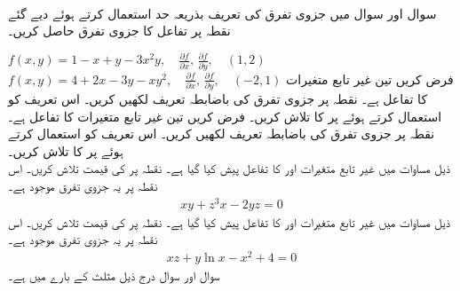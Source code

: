 \\
سوال  اور سوال  میں جزوی تفرق کی تعریف بذریعہ حد استعمال کرتے ہوئے دیے گئے نقطہ پر تفاعل کا جزوی تفرق حاصل کریں۔

$f(x,y)=1-x+y-3x^2y,\quad \frac{\partial f}{\partial x},\,\frac{\partial f}{\partial y},\quad (1,2)$
$f(x,y)=4+2x-3y-xy^2,\quad \frac{\partial f}{\partial x},\,\frac{\partial f}{\partial y},\quad (-2,1)$
فرض کریں  تین غیر تابع متغیرات کا تفاعل ہے۔ نقطہ  پر جزوی تفرق   کی باضابطہ تعریف  لکھیں کریں۔ اس تعریف کو استعمال کرتے ہوئے  پر  کا  تلاش کریں۔
فرض کریں  تین غیر تابع متغیرات کا تفاعل ہے۔ نقطہ  پر جزوی تفرق   کی باضابطہ تعریف  لکھیں کریں۔ اس تعریف کو استعمال کرتے ہوئے  پر  کا  تلاش کریں۔
\\
 ذیل مساوات  میں     غیر تابع متغیرات  اور  کا تفاعل  پیش کیا گیا ہے۔ نقطہ  پر  کی قیمت تلاش کریں۔ اس نقطہ پر   یہ  جزوی تفرق  موجود ہے۔  
\begin{align*}
xy+z^3x-2yz=0
\end{align*}
 ذیل مساوات  میں     غیر تابع متغیرات  اور  کا تفاعل  پیش کیا گیا ہے۔ نقطہ  پر  کی قیمت تلاش کریں۔ اس نقطہ پر   یہ  جزوی تفرق  موجود ہے۔  
\begin{align*}
xz+y\ln x-x^2+4=0
\end{align*}
سوال  اور سوال  درج ذیل مثلث  کے بارے میں ہے۔
\begin{center}
\end{center}

